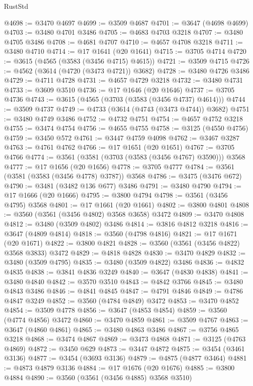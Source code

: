 \begin{lexlean}{RustStd}
\begin{coremodule}
@4698 := @3470 @4697
@4699 := @3509 @4687
@4701 := @3647 (@4698 @4699)
@4703 := @3480 @4701 @3486
@4705 := @4683 @4703 @3218
@4707 := @3480 @4705 @3486
@4708 := @4681 @4707
@4710 := @4657 @4708 @3218
@4711 := @3480 @4710
@4714 := @17 @1641 (@20 @1641)
@4715 := @3705 @4714
@4720 := @3615 (@4565 (@3583 (@3456 @4715) @4615))
@4721 := @3509 @4715
@4726 := @4562 (@3614 (@4720 (@3473 @4721)) @3682)
@4728 := @3480 @4726 @3486
@4729 := @4711 @4728
@4731 := @4657 @4729 @3218
@4732 := @3480 @4731
@4733 := @3609 @3510
@4736 := @17 @1646 (@20 @1646)
@4737 := @3705 @4736
@4743 := @3615 (@4565 (@3703 (@3583 (@3456 @4737) @4614)))
@4744 := @3509 @4737
@4749 := @4733 (@3614 (@4743 (@3473 @4744)) @3682)
@4751 := @3480 @4749 @3486
@4752 := @4732 @4751
@4754 := @4657 @4752 @3218
@4755 := @3474 @4754
@4756 := @4655 @4755
@4758 := @3125 (@4550 @4756)
@4759 := @3450 @572
@4761 := @3447 @4759 @4098
@4762 := @3467 @3287
@4763 := @4761 @4762
@4766 := @17 @1651 (@20 @1651)
@4767 := @3705 @4766
@4774 := @3561 (@3581 (@3703 (@3583 (@3456 @4767) @3590))) @3568
@4777 := @17 @1656 (@20 @1656)
@4778 := @3705 @4777
@4784 := @3561 (@3581 (@3583 (@3456 @4778) @3787)) @3568
@4786 := @3475 (@3476 @672)
@4790 := @3481 (@3482 @136 @677) @3486
@4791 := @3480 @4790
@4794 := @17 @1666 (@20 @1666)
@4795 := @3800 @4794
@4798 := @3561 (@3456 @4795) @3568
@4801 := @17 @1661 (@20 @1661)
@4802 := @3800 @4801
@4808 := @3560 (@3561 (@3456 @4802) @3568 @3658) @3472
@4809 := @3470 @4808
@4812 := @3480 (@3509 @4802) @3486
@4814 := @3816 @4812 @3218
@4816 := @3647 (@4809 @4814)
@4818 := @3560 (@4798 @4816)
@4821 := @17 @1671 (@20 @1671)
@4822 := @3800 @4821
@4828 := @3560 (@3561 (@3456 @4822) @3568 @3833) @3472
@4829 := @4818 @4828
@4830 := @3470 @4829
@4832 := @3480 (@3509 @4795)
@4835 := @3480 (@3509 @4822) @3486
@4836 := @4832 @4835
@4838 := @3841 @4836 @3249
@4840 := @3647 (@4830 @4838)
@4841 := @3480 @4840
@4842 := @3570 @3510
@4843 := @4842 @3766
@4845 := @3480 @4843 @3486
@4846 := @4841 @4845
@4847 := @4791 @4846
@4849 := @4786 @4847 @3249
@4852 := @3560 (@4784 @4849) @3472
@4853 := @3470 @4852
@4854 := @3509 @4778
@4856 := @3647 (@4853 @4854)
@4859 := @3560 (@4774 @4856) @3472
@4860 := @3470 @4859
@4861 := @3509 @4767
@4863 := @3647 (@4860 @4861)
@4865 := @3480 @4863 @3486
@4867 := @3756 @4865 @3218
@4868 := @3474 @4867
@4869 := @3473 @4868
@4871 := @3125 (@4763 @4869)
@4872 := @3450 @629
@4873 := @3447 @4872
@4875 := @3454 (@3461 @3136)
@4877 := @3454 (@3693 @3136)
@4879 := @4875 (@4877 @3464)
@4881 := @4873 @4879 @3136
@4884 := @17 @1676 (@20 @1676)
@4885 := @3800 @4884
@4890 := @3560 (@3561 (@3456 @4885) @3568 @3510)

\end{coremodule}
\end{lexlean}
